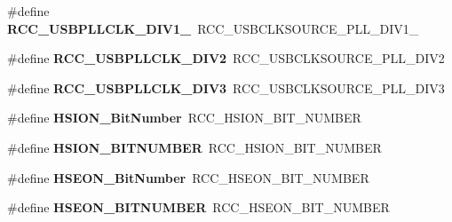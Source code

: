 \begin{DoxyCompactItemize}
\item 
\mbox{\label{group___h_a_l___r_c_c___aliased_ga5ce8367d15851ff6055cffc9c31ce174}} 
\#define {\bfseries R\+C\+C\+\_\+\+U\+S\+B\+P\+L\+L\+C\+L\+K\+\_\+\+D\+I\+V1\+\_}~R\+C\+C\+\_\+\+U\+S\+B\+C\+L\+K\+S\+O\+U\+R\+C\+E\+\_\+\+P\+L\+L\+\_\+\+D\+I\+V1\+\_
\item 
\mbox{\label{group___h_a_l___r_c_c___aliased_gabe13349c49b3ef0401d97c2b748ffe7b}} 
\#define {\bfseries R\+C\+C\+\_\+\+U\+S\+B\+P\+L\+L\+C\+L\+K\+\_\+\+D\+I\+V2}~R\+C\+C\+\_\+\+U\+S\+B\+C\+L\+K\+S\+O\+U\+R\+C\+E\+\_\+\+P\+L\+L\+\_\+\+D\+I\+V2
\item 
\mbox{\label{group___h_a_l___r_c_c___aliased_ga895e6eac56d6689996989b9417c9ad62}} 
\#define {\bfseries R\+C\+C\+\_\+\+U\+S\+B\+P\+L\+L\+C\+L\+K\+\_\+\+D\+I\+V3}~R\+C\+C\+\_\+\+U\+S\+B\+C\+L\+K\+S\+O\+U\+R\+C\+E\+\_\+\+P\+L\+L\+\_\+\+D\+I\+V3
\item 
\mbox{\label{group___h_a_l___r_c_c___aliased_ga3d3085e491cbef815d223afbe5bf1930}} 
\#define {\bfseries H\+S\+I\+O\+N\+\_\+\+Bit\+Number}~R\+C\+C\+\_\+\+H\+S\+I\+O\+N\+\_\+\+B\+I\+T\+\_\+\+N\+U\+M\+B\+ER
\item 
\mbox{\label{group___h_a_l___r_c_c___aliased_ga79f147c8b2f8fe05574f861483be5aa4}} 
\#define {\bfseries H\+S\+I\+O\+N\+\_\+\+B\+I\+T\+N\+U\+M\+B\+ER}~R\+C\+C\+\_\+\+H\+S\+I\+O\+N\+\_\+\+B\+I\+T\+\_\+\+N\+U\+M\+B\+ER
\item 
\mbox{\label{group___h_a_l___r_c_c___aliased_ga7b52a4205001d305fb5ef1d6b5bfd2cd}} 
\#define {\bfseries H\+S\+E\+O\+N\+\_\+\+Bit\+Number}~R\+C\+C\+\_\+\+H\+S\+E\+O\+N\+\_\+\+B\+I\+T\+\_\+\+N\+U\+M\+B\+ER
\item 
\mbox{\label{group___h_a_l___r_c_c___aliased_ga6ca813609511152216b194e490bef027}} 
\#define {\bfseries H\+S\+E\+O\+N\+\_\+\+B\+I\+T\+N\+U\+M\+B\+ER}~R\+C\+C\+\_\+\+H\+S\+E\+O\+N\+\_\+\+B\+I\+T\+\_\+\+N\+U\+M\+B\+ER
\item 
\mbox{\label{group___h_a_l___r_c_c___aliased_ga269ef9e8d23c9ea0c0a0df0d361c3467}} 

\end{DoxyCompactItemize}
